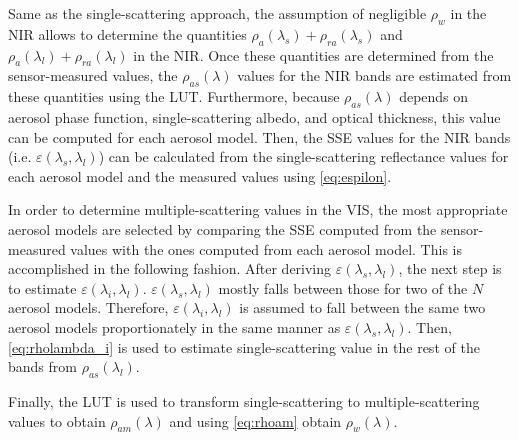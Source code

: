 Same as the single-scattering approach, the assumption of negligible $\rho_w$ in the NIR allows to determine the quantities $\rho_a(\lambda_s)+\rho_{ra}(\lambda_s)$ and $\rho_a(\lambda_l)+\rho_{ra}(\lambda_l)$ in the NIR. Once these quantities are determined from the sensor-measured values, the $\rho_{as}(\lambda)$ values for the NIR bands are estimated from these quantities using the LUT. Furthermore, because $\rho_{as}(\lambda)$ depends on aerosol phase function, single-scattering albedo, and optical thickness, this value can be computed for each aerosol model. Then, the SSE values for the NIR bands (i.e. $\varepsilon(\lambda_s,\lambda_l)$) can be calculated from the single-scattering reflectance values for each aerosol model and the measured values using \autoref{eq:espilon}. 

In order to determine multiple-scattering values in the VIS, the most appropriate aerosol models are selected by comparing the SSE computed from the sensor-measured values with the ones computed from each aerosol model. This is accomplished in the following fashion. After deriving $\varepsilon(\lambda_s,\lambda_l)$, the next step is to estimate $\varepsilon(\lambda_i,\lambda_l)$. $\varepsilon(\lambda_s,\lambda_l)$ mostly falls between those for two of the $N$ aerosol models. Therefore, $\varepsilon(\lambda_i,\lambda_l)$ is assumed to fall between the same two aerosol models proportionately in the same manner as $\varepsilon(\lambda_s,\lambda_l)$. Then, \autoref{eq:rholambda_i} is used to estimate single-scattering value in the rest of the bands from $\rho_{as}(\lambda_l)$. 

Finally, the LUT is used to transform single-scattering to multiple-scattering values to obtain $\rho_{am}(\lambda)$ and using \autoref{eq:rhoam} obtain $\rho_w(\lambda)$. 

